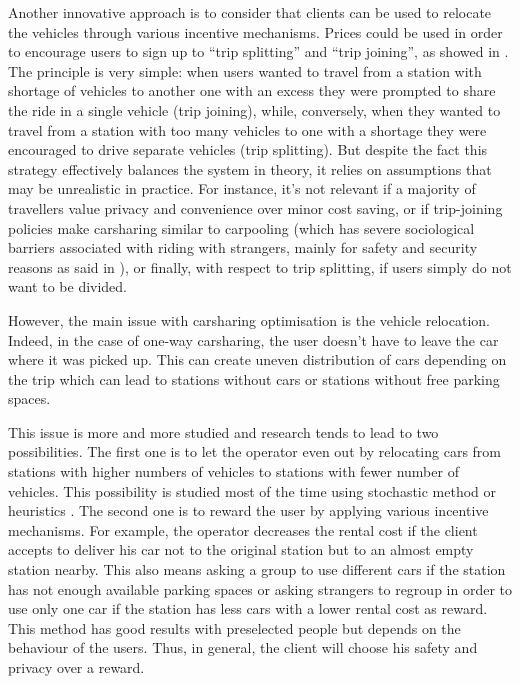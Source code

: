 \begin{bibunit}[ieeetr]
\medskip
Another innovative approach is to consider that clients can be used to relocate the vehicles through various incentive mechanisms.
Prices could be used in order to encourage users to sign up to ``trip splitting'' and ``trip joining'', as showed in \cite{barth_user_based_2004}.
The principle is very simple: when users wanted to travel from a station with shortage of vehicles to another one with an excess they were prompted to share the ride in a single vehicle (trip joining), while, conversely, when they wanted to travel from a station with too many vehicles to one with a shortage they were encouraged to drive separate vehicles (trip splitting).
But despite the fact this strategy effectively balances the system in theory, it relies on assumptions that may be unrealistic in practice.
For instance, it's not relevant if a majority of travellers value privacy and convenience over minor cost saving, or if trip-joining policies make carsharing similar to carpooling (which has severe sociological barriers associated with riding with strangers, mainly for safety and security reasons as said in \cite{chan_ridesharing_2012, correia_carpooling_2011}), or finally, with respect to trip splitting, if users simply do not want to be divided.

However, the main issue with carsharing optimisation is the vehicle relocation.
Indeed, in the case of one-way carsharing, the user doesn't have to leave the car where it was picked up.
This can create uneven distribution of cars depending on the trip which can lead to stations without cars or stations without free parking spaces.

This issue is more and more studied and research tends to lead to two possibilities.
The first one is to let the operator even out by relocating cars from stations with higher numbers of vehicles to stations with fewer number of vehicles.
This possibility is studied most of the time using stochastic method \cite{fan_optimizing_2014} or heuristics \cite{duron_analysis_2000}.
The second one is to reward the user by applying various incentive mechanisms.
For example, the operator decreases the rental cost if the client accepts to deliver his car not to the original station but to an almost empty station nearby.
This also means asking a group to use different cars if the station has not enough available parking spaces or asking strangers to regroup in order to use only one car if the station has less cars with a lower rental cost as reward.
This method has good results with preselected people but depends on the behaviour of the users.
Thus, in general, the client will choose his safety and privacy over a reward.







\end{bibunit}

